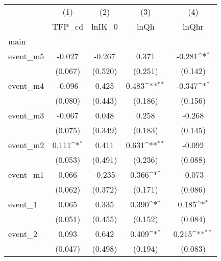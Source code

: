 {
\def\sym#1{\ifmmode^{#1}\else\(^{#1}\)\fi}
\begin{tabular}{l*{4}{c}}
\hline\hline
            &\multicolumn{1}{c}{(1)}&\multicolumn{1}{c}{(2)}&\multicolumn{1}{c}{(3)}&\multicolumn{1}{c}{(4)}\\
            &\multicolumn{1}{c}{TFP\_cd}&\multicolumn{1}{c}{lnIK\_0}&\multicolumn{1}{c}{lnQh}&\multicolumn{1}{c}{lnQhr}\\
\hline
main        &                     &                     &                     &                     \\
event\_m5    &      -0.027         &      -0.267         &       0.371         &      -0.281\sym{*}  \\
            &     (0.067)         &     (0.520)         &     (0.251)         &     (0.142)         \\
[1em]
event\_m4    &      -0.096         &       0.425         &       0.483\sym{**} &      -0.347\sym{*}  \\
            &     (0.080)         &     (0.443)         &     (0.186)         &     (0.156)         \\
[1em]
event\_m3    &      -0.067         &       0.048         &       0.258         &      -0.268         \\
            &     (0.075)         &     (0.349)         &     (0.183)         &     (0.145)         \\
[1em]
event\_m2    &       0.111\sym{*}  &       0.411         &       0.631\sym{**} &      -0.092         \\
            &     (0.053)         &     (0.491)         &     (0.236)         &     (0.088)         \\
[1em]
event\_m1    &       0.066         &      -0.235         &       0.366\sym{*}  &      -0.073         \\
            &     (0.062)         &     (0.372)         &     (0.171)         &     (0.086)         \\
[1em]
event\_1     &       0.065         &       0.335         &       0.390\sym{*}  &       0.185\sym{*}  \\
            &     (0.051)         &     (0.455)         &     (0.152)         &     (0.084)         \\
[1em]
event\_2     &       0.093         &       0.642         &       0.409\sym{*}  &       0.215\sym{**} \\
            &     (0.047)         &     (0.498)         &     (0.194)         &     (0.083)         \\

\end{tabular}}
